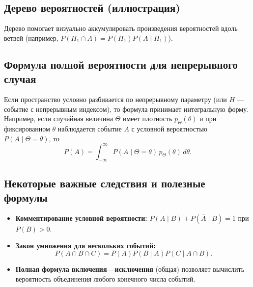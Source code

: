 \subsection{Дерево вероятностей (иллюстрация)}
\begin{center}
\end{center}

Дерево помогает визуально аккумулировать произведения вероятностей вдоль ветвей (например, $P(H_1\cap A)=P(H_1)P(A\mid H_1)$).

\subsection{Формула полной вероятности для непрерывного случая}
Если пространство условно разбивается по непрерывному параметру (или $H$ — событие с непрерывным индексом), то формула принимает интегральную форму. Например, если случайная величина $\Theta$ имеет плотность $p_\Theta(\theta)$ и при фиксированном $\theta$ наблюдается событие $A$ с условной вероятностью $P(A\mid \Theta=\theta)$, то
\[
P(A) = \int_{-\infty}^{\infty} P(A\mid \Theta=\theta)\, p_\Theta(\theta)\, d\theta.
\]

\subsection{Некоторые важные следствия и полезные формулы}
\begin{itemize}
  \item \textbf{Комментирование условной вероятности:} $P(A\mid B) + P(\overline{A}\mid B) = 1$ при $P(B)>0$.
  \item \textbf{Закон умножения для нескольких событий:}
  \[
  P(A\cap B\cap C) = P(A)P(B\mid A)P(C\mid A\cap B).
  \]
  \item \textbf{Полная формула включения—исключения} (общая) позволяет вычислить вероятность объединения любого конечного числа событий.
\end{itemize}

